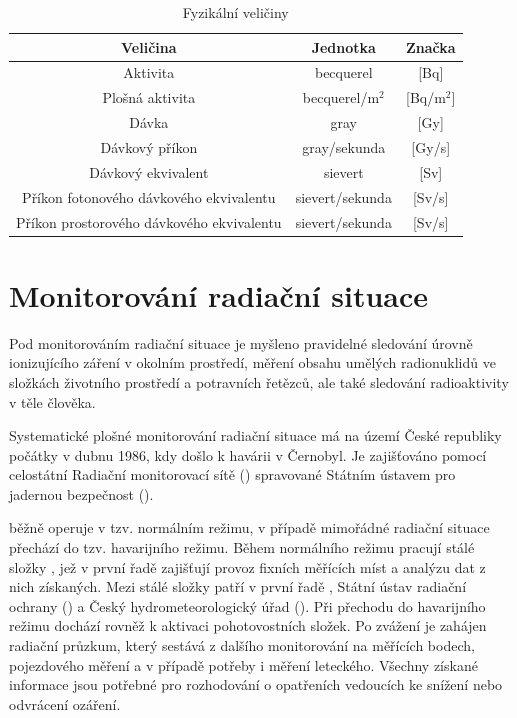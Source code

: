 \begin{itemize}
		\begin{table}[h!]
			\centering
			\caption{Fyzikální veličiny}
			\label{tab:tab_veliciny}
			\begin{tabular}{|c|c|c|}
				\hline
				\textbf{Veličina}           			& \textbf{Jednotka}  & \textbf{Značka}  \\ \hline
				Aktivita								& becquerel			 & {[}Bq{]}			\\ \hline
				Plošná aktivita							& becquerel/m$^2$	 & {[}Bq/m$^2${]}	\\ \hline
				Dávka                      	 			& gray               & {[}Gy{]}         \\ \hline
				Dávkový příkon              			& gray/sekunda		 & {[}Gy/s{]}       \\ \hline
				Dávkový ekvivalent          			& sievert            & {[}Sv{]}         \\ \hline
				Příkon fotonového dávkového ekvivalentu & sievert/sekunda	 & {[}Sv/s{]}       \\ \hline
				Příkon prostorového dávkového ekvivalentu & sievert/sekunda	 & {[}Sv/s{]}       \\ \hline
			\end{tabular}
		\end{table}
\end{itemize}

\section{Monitorování radiační situace}

Pod monitorováním radiační situace je myšleno pravidelné sledování úrovně ionizujícího záření v okolním prostředí, měření obsahu umělých radionuklidů ve složkách životního prostředí a potravních řetězců, ale také sledování radioaktivity v těle člověka. \cite{monras}

Systematické plošné monitorování radiační situace má na území České republiky počátky v dubnu 1986, kdy došlo k havárii v  Černobyl. Je zajišťováno pomocí celostátní Radiační monitorovací sítě () spravované Státním ústavem pro jadernou bezpečnost ().

 běžně operuje v tzv. normálním režimu, v případě mimořádné radiační situace přechází do tzv. havarijního režimu. Během normálního režimu pracují stálé složky , jež v první řadě zajišťují provoz fixních měřících míst a analýzu dat z nich získaných. Mezi stálé složky  patří v první řadě , Státní ústav radiační ochrany () a Český hydrometeorologický úřad (). Při přechodu do havarijního režimu dochází rovněž k aktivaci pohotovostních složek. Po zvážení je zahájen radiační průzkum, který sestává z dalšího monitorování na měřících bodech, pojezdového měření a v případě potřeby i měření leteckého. \cite{suro} Všechny získané informace jsou potřebné pro rozhodování o opatřeních vedoucích ke snížení nebo odvrácení ozáření.

